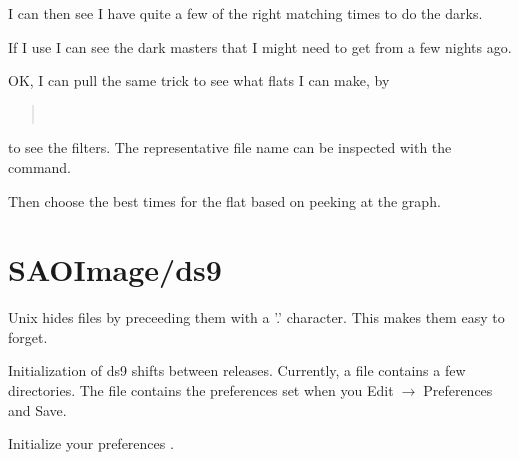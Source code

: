 \documentclass[letter,11pt,oneside]{article}
\newcommand{\dhl}[1]{{\color{verbcolor}{\texttt#1}}}
\newcommand{\menu}{\ensuremath{\;\rightarrow\;}}
\begin{document}
I can then see I have quite a few of the right matching times to do the darks.

If I use {\color{verbcolor}{\verb#IMAGETYP ?= object#}} I can see the
dark masters that I might need to get from a few nights ago.

OK, I can pull the same trick to see what flats I can make, by

\begin{quote}
{\color{verbcolor}{\verb#hselect c_*fits $I,EXPTIME,XBINNING,YBINNING,FILTER "(IMAGETYP ?= 'dark')" > l.l#}}\\
{\color{verbcolor}{\verb#!sort -n -k 2 l.l ! uniq -c -f 1#}}
\end{quote}

to see the filters. The representative file name can be inspected
with the {\color{verbcolor}{\verb#stdas/histogram#}} command.

\begin{quote}
{\color{verbcolor}{\verb#histogram c_rep_flat_ha.fits filline+#}}
\end{quote}

Then choose the best times for the flat based on peeking at the
graph.

\clearpage
\section{SAOImage/ds9}

Unix hides files by preceeding them with a '.' character. This makes
them easy to forget. 

Initialization of ds9 shifts between releases. Currently, a file
\dhl{\$HOME/.ds9/} contains a few directories. The \dhl{ds9.8.0.prf}
file contains the preferences set when you Edit\menu Preferences
and Save. 

Initialize your preferences .
\end{document}
